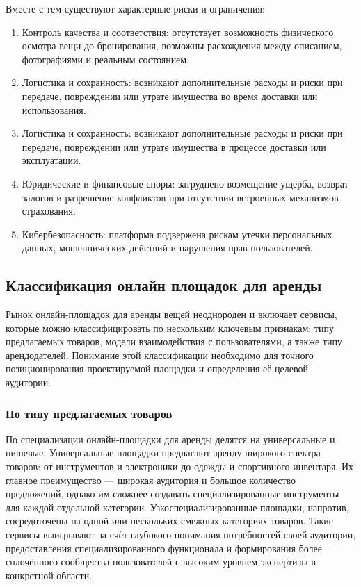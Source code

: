 Вместе с тем существуют характерные риски и ограничения:
\begin{enumerate}
\item Контроль качества и соответствия: отсутствует возможность физического осмотра вещи до бронирования, возможны расхождения между описанием, фотографиями и реальным состоянием.
\item Логистика и сохранность: возникают дополнительные расходы и риски при передаче, повреждении или утрате имущества во время доставки или использования.
\item Логистика и сохранность: возникают дополнительные расходы и риски при передаче, повреждении или утрате имущества в процессе доставки или эксплуатации.
\item Юридические и финансовые споры: затруднено возмещение ущерба, возврат залогов и разрешение конфликтов при отсутствии встроенных механизмов страхования.
\item Кибербезопасность: платформа подвержена рискам утечки персональных данных, мошеннических действий и нарушения прав пользователей.
\end{enumerate}

\subsection{Классификация онлайн площадок для аренды}
Рынок онлайн-площадок для аренды вещей неоднороден и включает сервисы, которые можно классифицировать по нескольким ключевым признакам: типу предлагаемых товаров, модели взаимодействия с пользователями, а также типу арендодателей. Понимание этой классификации необходимо для точного позиционирования проектируемой площадки и определения её целевой аудитории.
\subsubsection{По типу предлагаемых товаров}
По специализации онлайн-площадки для аренды делятся на универсальные и нишевые. Универсальные площадки предлагают аренду широкого спектра товаров: от инструментов и электроники до одежды и спортивного инвентаря. Их главное преимущество — широкая аудитория и большое количество предложений, однако им сложнее создавать специализированные инструменты для каждой отдельной категории. Узкоспециализированные площадки, напротив, сосредоточены на одной или нескольких смежных категориях товаров. Такие сервисы выигрывают за счёт глубокого понимания потребностей своей аудитории, предоставления специализированного функционала и формирования более сплочённого сообщества пользователей с высоким уровнем экспертизы в конкретной области.
